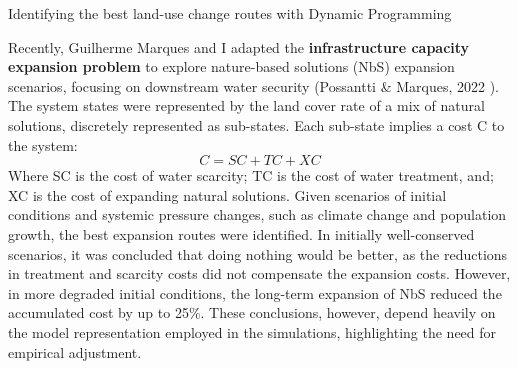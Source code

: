\documentclass[./main_en.tex]{subfiles}
\begin{document}
\begin{simplebox}[
    float=ht!,
    label={highlight_dynamic_programming},
    nameref={Dynamic Programming}
    ]{Identifying the best land-use change routes with Dynamic Programming}
    \begin{minipage}[t]{\linewidth}    
    \par Recently, Guilherme Marques and I adapted the \textbf{infrastructure capacity expansion problem} to explore nature-based solutions (NbS) expansion scenarios, focusing on downstream water security (Possantti \& Marques, 2022 \cite{Possantti2022a}). The system states were represented by the land cover rate of a mix of natural solutions, discretely represented as sub-states. Each sub-state implies a cost C to the system:
    \begin{equation}
        \label{eq:dpcost}
        C = SC + TC + XC
    \end{equation}
    Where SC is the cost of water scarcity; TC is the cost of water treatment, and; XC is the cost of expanding natural solutions. Given scenarios of initial conditions and systemic pressure changes, such as climate change and population growth, the best expansion routes were identified. In initially well-conserved scenarios, it was concluded that doing nothing would be better, as the reductions in treatment and scarcity costs did not compensate the expansion costs. However, in more degraded initial conditions, the long-term expansion of NbS reduced the accumulated cost by up to 25\%. These conclusions, however, depend heavily on the model representation employed in the simulations, highlighting the need for empirical adjustment.
    
    \end{minipage}
\label{box:dp}
\normalsize
\end{simplebox}
\end{document}
